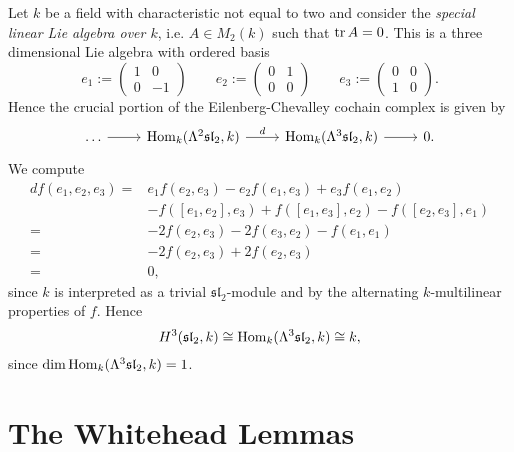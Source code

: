 \begin{example}[$H^3(\mathfrak{sl}_2,k)$]
	\label{ex:H^3_sl_2_k}
	Let $k$ be a field with characteristic not equal to two and consider the \emph{special linear Lie algebra over $k$}, i.e. $A \in M_2(k)$ such that $\operatorname{tr} A = 0$. This is a three dimensional Lie algebra with ordered basis 	
	\begin{equation*}
		e_1 := \begin{pmatrix}
			1 & 0\\
			0 & -1
		\end{pmatrix} \qquad
		e_2 := \begin{pmatrix}
			0 & 1\\
			0 & 0
		\end{pmatrix} \qquad
		e_3 := \begin{pmatrix}
			0 & 0\\
			1 & 0
		\end{pmatrix}.
	\end{equation*}
	Hence the crucial portion of the Eilenberg-Chevalley cochain complex is given by
	\begin{equation*}
		\begin{tikzcd}
			\dots \arrow[r] & \Hom_k(\Lambda^2\mathfrak{sl}_2,k) \arrow[r,"d"] & \Hom_k(\Lambda^3\mathfrak{sl}_2,k) \arrow[r] & 0.
		\end{tikzcd}
	\end{equation*}
	We compute
	\begin{align*}
		df(e_1,e_2,e_3) =& e_1f(e_2,e_3) - e_2f(e_1,e_3) + e_3f(e_1,e_2)\\
		&- f([e_1,e_2],e_3) + f([e_1,e_3],e_2) - f([e_2,e_3],e_1)\\
		=& -2f(e_2,e_3) - 2f(e_3,e_2) - f(e_1,e_1)\\
		=& -2f(e_2,e_3) + 2f(e_2,e_3)\\
		=& 0,
	\end{align*}
	\noindent since $k$ is interpreted as a trivial $\mathfrak{sl}_2$-module and by the alternating $k$-multilinear properties of $f$. Hence
	\begin{equation*}
		H^3(\mathfrak{sl}_2,k) \cong \operatorname{Hom}_k(\Lambda^3 \mathfrak{sl}_2,k) \cong k,
	\end{equation*}
	\noindent since $\dim \operatorname{Hom}_k(\Lambda^3\mathfrak{sl}_2,k) = 1$.
\end{example}

\section*{The Whitehead Lemmas}

